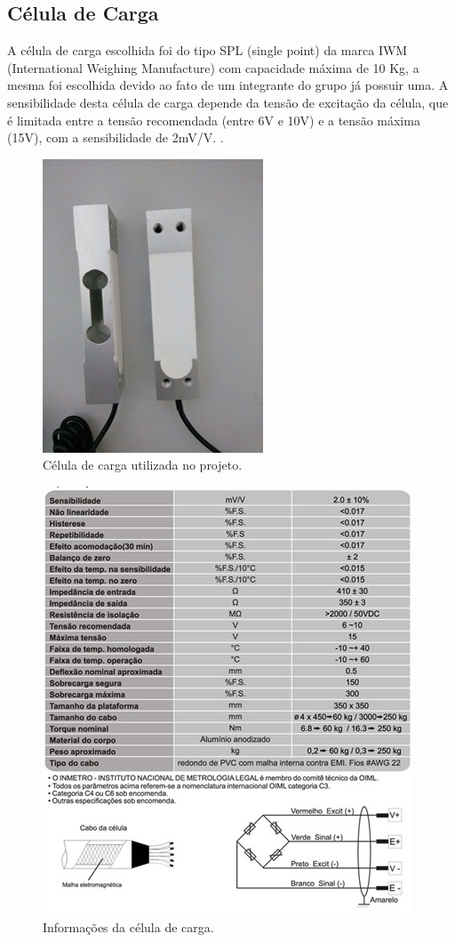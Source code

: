 \subsection{Célula de Carga}
A célula de carga escolhida foi do tipo SPL (single point) da marca IWM (International Weighing Manufacture) com capacidade máxima de 10 Kg, a mesma foi escolhida devido ao fato de um integrante do grupo já possuir uma. A sensibilidade desta célula de carga depende da tensão de excitação da célula, que é limitada entre a tensão recomendada (entre 6V e 10V) e a tensão máxima (15V), com a sensibilidade de 2mV/V. \cite{celulaCarga}.

\begin{figure}[!ht]
	\centering
		\includegraphics[scale=0.6]{figuras/eletronica/11-Celula-de-carga.jpg}
	\caption{Célula de carga utilizada no projeto.}
\end{figure}

\begin{figure}[!ht]
	\centering
		\includegraphics[scale=0.9]{figuras/eletronica/12-Informacoes-celula-carga.jpg}
	\caption{Informações da célula de carga.}
\end{figure}

